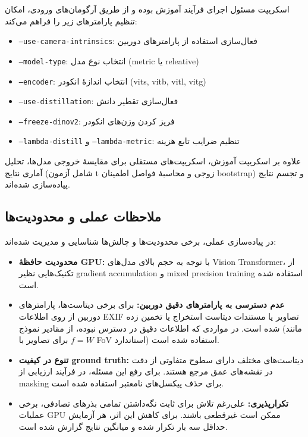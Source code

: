 اسکریپت  مسئول اجرای فرآیند آموزش بوده و از طریق آرگومان‌های ورودی، امکان تنظیم پارامترهای زیر را فراهم می‌کند:

\begin{itemize}
    \item \texttt{--use-camera-intrinsics}: فعال‌سازی استفاده از پارامترهای دوربین
    \item \texttt{--model-type}: انتخاب نوع مدل (metric یا releative)
    \item \texttt{--encoder}: انتخاب اندازهٔ انکودر (vits, vitb, vitl, vitg)
    \item \texttt{--use-distillation}: فعال‌سازی تقطیر دانش
    \item \texttt{--freeze-dinov2}: فریز کردن وزن‌های انکودر
    \item \texttt{--lambda-distill} و \texttt{--lambda-metric}: تنظیم ضرایب تابع هزینه
\end{itemize}

علاوه بر اسکریپت آموزش، اسکریپت‌های مستقلی برای مقایسهٔ خروجی مدل‌ها، تحلیل آماری نتایج (شامل آزمون t زوجی و محاسبهٔ فواصل اطمینان bootstrap) و تجسم نتایج پیاده‌سازی شده‌اند.

\subsection{ملاحظات عملی و محدودیت‌ها}

در پیاده‌سازی عملی، برخی محدودیت‌ها و چالش‌ها شناسایی و مدیریت شده‌اند:

\begin{itemize}
    \item \textbf{محدودیت حافظهٔ GPU:} با توجه به حجم بالای مدل‌های Vision Transformer، از تکنیک‌هایی نظیر gradient accumulation و mixed precision training استفاده شده است.
    
    \item \textbf{عدم دسترسی به پارامترهای دقیق دوربین:} برای برخی دیتاست‌ها، پارامترهای دوربین از روی اطلاعات EXIF تصاویر یا مستندات دیتاست استخراج یا تخمین زده شده است. در مواردی که اطلاعات دقیق در دسترس نبوده، از مقادیر نموذج (مانند $f = W$ برای تصاویر با FoV استاندارد) استفاده شده است.
    
    \item \textbf{تنوع در کیفیت ground truth:} دیتاست‌های مختلف دارای سطوح متفاوتی از دقت در نقشه‌های عمق مرجع هستند. برای رفع این مسئله، در فرآیند ارزیابی از masking برای حذف پیکسل‌های نامعتبر استفاده شده است.
    
    \item \textbf{تکرارپذیری:} علی‌رغم تلاش برای ثابت نگه‌داشتن تمامی بذرهای تصادفی، برخی عملیات GPU ممکن است غیرقطعی باشند. برای کاهش این اثر، هر آزمایش حداقل سه بار تکرار شده و میانگین نتایج گزارش شده است.
\end{itemize}

